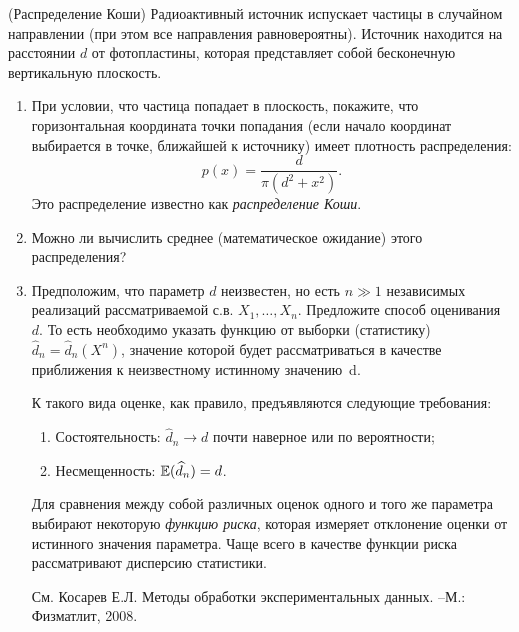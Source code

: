 \begin{problem}(Распределение Коши)
Радиоактивный источник испускает 
частицы в случайном направлении (при этом все направления равновероятны). 
Источник находится на расстоянии $d$ от фотопластины, которая представляет 
собой бесконечную вертикальную плоскость.

\begin{enumerate}
\item При условии, что частица попадает в плоскость, покажите, что 
горизонтальная координата точки попадания (если начало координат выбирается 
в точке, ближайшей к источнику) имеет плотность распределения:
\[
p\left( x \right)=\frac{d}{\pi \left( {d^2+x^2} \right)}.
\]
Это распределение известно как \textit{распределение Коши}.

\item Можно ли вычислить среднее (математическое ожидание) этого 
распределения?

\item Предположим, что параметр $d$ неизвестен, но есть $n \gg 1$ независимых реализаций рассматриваемой с.в. $X_1, \ldots, X_n$. Предложите способ оценивания $d$. То есть необходимо указать функцию от выборки (статистику) $\widehat d_n=\widehat d_n(X^n)$,
значение которой будет рассматриваться в качестве приближения к неизвестному истинному значению~d. 
\begin{remark}
К такого вида оценке, как правило, предъявляются следующие требования:
\begin{enumerate}
\item Состоятельность: $\widehat d_n \rightarrow d$ почти наверное или по вероятности;
\item Несмещенность: $\mathrm{{\mathbb E}}(\widehat d_n) = d$.
\end{enumerate}

Для сравнения между собой различных оценок одного и того же параметра выбирают некоторую \textit{функцию риска}, которая измеряет отклонение оценки от истинного значения параметра.
Чаще всего в качестве функции риска рассматривают дисперсию статистики. 

См. Косарев Е.Л. Методы обработки экспериментальных данных. --М.: Физматлит, 2008.
\end{remark}

\end{enumerate}
\end{problem}

